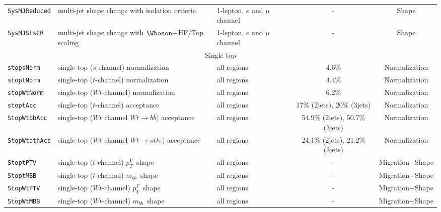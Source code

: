 \begin{table}
{\begin{tabular}{l|llcc}
\texttt{SysMJReduced} & multi-jet shape change with isolation criteria & 1-lepton, $e$ and $\mu$ channel & - & Shape \\
\texttt{SysMJSFsCR} & multi-jet shape change with $\Wboson +$HF/Top scaling & 1-lepton, $e$ and $\mu$ channel & - & Shape \\
\hline
\hline
\multicolumn{5}{c}{Single top}\\
\hline
\texttt{stopsNorm}    & single-top ($s$-channel) normalization 	&  all regions	& 4.6\%	&Normalization\\
\texttt{stoptNorm}    & single-top ($t$-channel) normalization 	&  all regions	& 4.4\%	&Normalization\\
\texttt{stopWtNorm}   & single-top ($Wt$-channel) normalization &  all regions	& 6.2\%	&Normalization\\
\texttt{stoptAcc}     & single-top ($t$-channel) acceptance 	&  all regions & 17\% (2jets), 20\% (3jets)	&Normalization\\
\texttt{StopWtbbAcc} 	& single-top ($Wt$ channel $Wt\rightarrow b\bar{b}$) acceptance &  all regions	& 54.9\% (2jets), 50.7\% (3jets)	&Normalization\\
\texttt{StopWtothAcc} 	& single-top ($Wt$ channel $Wt\rightarrow oth.$) acceptance &  all regions	& 24.1\% (2jets), 21.2\% (3jets)	&Normalization\\
\hline
\texttt{StoptPTV} & single-top ($t$-channel) $p_T^V$\ shape & all regions & - & Migration+Shape\\
\texttt{StoptMBB} & single-top ($t$-channel) $m_{bb}$\ shape & all regions & - & Migration+Shape\\
\texttt{StopWtPTV} & single-top ($Wt$-channel) $p_T^V$\ shape & all regions & - & Migration+Shape\\
\texttt{StopWtMBB} & single-top ($Wt$-channel) $m_{bb}$\ shape & all regions & - & Migration+Shape\\

\end{tabular}}
\end{table}
